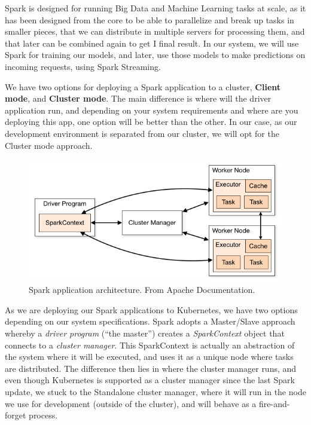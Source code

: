 Spark is designed for running Big Data and Machine Learning tasks at scale, as it has been designed from the core to be able to parallelize and break up tasks in smaller pieces, that we can distribute in multiple servers for processing them, and that later can be combined again to get I final result. In our system, we will use Spark for training our models, and later, use those models to make predictions on incoming requests, using Spark Streaming.

We have two options for deploying a Spark application to a cluster, \textbf{Client mode}, and \textbf{Cluster mode}. The main difference is where will the driver application run, and depending on your system requirements and where are you deploying this app, one option will be better than the other. In our case, as our development environment is separated from our cluster, we will opt for the Cluster mode approach.

\begin{figure}[H]
	\centering
	\includegraphics[width=1\linewidth]{imagenes/spark-modes.png}
	\caption{Spark application architecture. From Apache Documentation\cite{spark}.}
	\label{spark-modes}
\end{figure}

As we are deploying our Spark applications to Kubernetes, we have two options depending on our system specifications. Spark adopts a Master/Slave approach whereby a \textit{driver program} (“the master”) creates a \textit{SparkContext} object that connects to a \textit{cluster manager}. This SparkContext is actually an abstraction of the system where it will be executed, and uses it as a unique node where tasks are distributed. The difference then lies in where the cluster manager runs, and even though Kubernetes is supported as a cluster manager since the last Spark update, we stuck to the Standalone cluster manager, where it will run in the node we use for development (outside of the cluster), and will behave as a fire-and-forget process.

